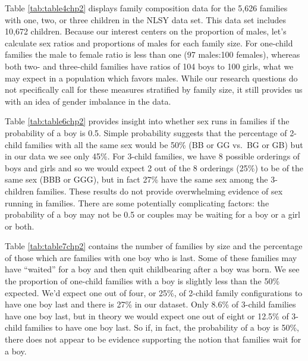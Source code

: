 \documentclass[
]{krantz}
\begin{document}
Table \ref{tab:table4chp2} displays family composition data for the 5,626 families with one, two, or three children in the NLSY data set. This data set includes 10,672 children. Because our interest centers on the proportion of males, let's calculate sex ratios and proportions of males for each family size. For one-child families the male to female ratio is less than one (97 males:100 females), whereas both two- and three-child families have ratios of 104 boys to 100 girls, what we may expect in a population which favors males. While our research questions do not specifically call for these measures stratified by family size, it still provides us with an idea of gender imbalance in the data.

Table \ref{tab:table6chp2} provides insight into whether sex runs in families if the probability of a boy is 0.5. Simple probability suggests that the percentage of 2-child families with all the same sex would be 50\% (BB or GG vs.~BG or GB) but in our data we see only 45\%. For 3-child families, we have 8 possible orderings of boys and girls and so we would expect 2 out of the 8 orderings (25\%) to be of the same sex (BBB or GGG), but in fact 27\% have the same sex among the 3-children families. These results do not provide overwhelming evidence of sex running in families. There are some potentially complicating factors: the probability of a boy may not be 0.5 or couples may be waiting for a boy or a girl or both.

\begin{table}
\centering
\caption{\label{tab:table6chp2}Proportion of families in NLSY data with all the same sex by number of children in the family. Note that 1-child families are all homogeneous with respect to sex, so we look at 2- and 3-child families.}
\centering
{}
\end{table}

Table \ref{tab:table7chp2} contains the number of families by size and the percentage of those which are families with one boy who is last. Some of these families may have ``waited'' for a boy and then quit childbearing after a boy was born. We see the proportion of one-child families with a boy is slightly less than the 50\% expected. We'd expect one out of four, or 25\%, of 2-child family configurations to have one boy last and there is 27\% in our dataset. Only 8.6\% of 3-child families have one boy last, but in theory we would expect one out of eight or 12.5\% of 3-child families to have one boy last. So if, in fact, the probability of a boy is 50\%, there does not appear to be evidence supporting the notion that families wait for a boy.
\end{document}
